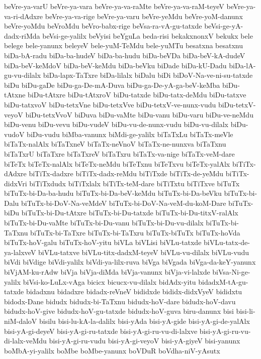 {beVre-ya-varU
beVre-ya-vara
beVre-ya-va-raMte
beVre-ya-va-raM-teyeV
beVre-ya-va-ri-dAdxre
beVre-ya-va-rige
beVre-ya-varu
beVre-yeMdu
beVre-yoM-danunx
beVre-yoMdu
beVroMdu
beVro-babx-rige
beVsa-ra-vA-gu-tatxde
beVsi-ge-yA-dadx-riMda
beVsi-ge-yalilx
beVyisi
beYguLa
beda-risi
bekakxnonxV
bekukx
bele
belege
bele-yanunx
beleyeV
bele-yuM-TeMdu
bele-yuMTu
besatxna
besatxnu
biDa-bA-radu
biDa-ba-hudeV
biDa-ba-hudu
biDa-beVDa
biDa-beV-kA-dudeV
biDa-beV-keMdoV
biDa-beV-keMdu
biDa-beVku
biDade
biDa-kU-Dadu
biDa-lA-gu-vu-dilalx
biDa-lapx-TaTxre
biDa-lilalx
biDalu
biDi
biDoV-Na-ve-ni-su-tatxde
biDu
biDu-gaDe
biDu-ga-De-mA-Duva
biDu-ga-De-yA-ga-beV-keMba
biDu-tAtxne
biDu-tAtxre
biDu-tAtxroV
biDu-tatxde
biDu-tatx-deMdu
biDu-tatxve
biDu-tatxvoV
biDu-tetxVne
biDu-tetxVve
biDu-tetxV-ve-nunx-vudu
biDu-tetxV-veyoV
biDu-tetxVvoV
biDuva
biDu-vaMte
biDu-vanu
biDu-varu
biDu-ve-neMdu
biDu-venu
biDu-vevu
biDu-vudeV
biDu-vu-de-nunx-vudu
biDu-vu-dilalx
biDu-vudoV
biDu-vudu
biMba-vanunx
biMdi-ge-yalilx
biTaTxLu
biTaTx-meVle
biTaTx-nalAlx
biTaTxneV
biTaTx-neVnoV
biTaTx-ne-nunxva
biTaTxnu
biTaTxrU
biTaTxre
biTaTxreV
biTaTxru
biTaTx-va-nige
biTaTx-veM-dare
biTeTx
biTeTx-nalAlx
biTeTx-neMdu
biTeTxnu
biTeTxvu
biTeTx-yalAlx
biTiTx-dAdxre
biTiTx-dadxre
biTiTx-dadx-reMdu
biTiTxde
biTiTx-de-yeMdu
biTiTx-didxVri
biTiTxdudx
biTiTxlalx
biTiTx-teM-dare
biTiTxtu
biTiTxve
biTuTx
biTuTx-bi-Da-ba-hudu
biTuTx-bi-Da-beV-keMdu
biTuTx-bi-Da-beVku
biTuTx-bi-Dalu
biTuTx-bi-DoV-Na-veMdeV
biTuTx-bi-DoV-Na-veM-du-koM-Dare
biTuTx-biDu
biTuTx-bi-Du-tAtxre
biTuTx-bi-Du-tatxde
biTuTx-bi-Du-titxV-ralAlx
biTuTx-bi-Du-vaMte
biTuTx-bi-Du-vanu
biTuTx-bi-Du-vu-dilalx
biTuTx-bi-TaTxnu
biTuTx-bi-TaTxre
biTuTx-bi-TaTxru
biTuTx-biTuTx
biTuTx-hoVda
biTuTx-hoV-galu
biTuTx-hoV-yitu
biVLa
biVLisi
biVLu-tatxde
biVLu-tatx-de-ya-lalxveV
biVLu-tatxve
biVLu-titx-dadxM-teyeV
biVLu-vu-dilalx
biVLu-vudu
biVdi
biVdige
biVdi-yalilx
biVdi-ya-lilx-ruva
biVga
biVgada
biVga-da-keY-yanunx
biVjAM-ku-rAdw
biVja
biVja-diMda
biVja-vanunx
biVja-vi-lalxde
biVsa-Ni-ge-yalilx
biVsi-ko-LuLx-vAga
bicicx
bicucx-vu-dilalx
bidAdx-yitu
bidadxM-tA-gu-tatxde
bidadxnu
bidadxre
bidadx-reVneV
bididxde
bididx-didxVyeV
bididxtu
bidodx-Dane
bidudx
bidudx-bi-TaTxnu
bidudx-hoV-dare
bidudx-hoV-davu
bidudx-hoV-give
bidudx-hoV-gu-tatxde
bidudx-hoV-guva
biru-danunx
bisi
bisi-li-niM-daloV
bisilu
bisi-lu-kA-la-dalilx
bisi-yAda
bisi-yA-gide
bisi-yA-gi-de-yalAlx
bisi-yA-gi-deyeV
bisi-yA-gi-ru-tatxde
bisi-yA-gi-ru-vu-di-lalxve
bisi-yA-gi-ru-vu-di-lalx-veMdu
bisi-yA-gi-ru-vudu
bisi-yA-gi-veyoV
bisi-yA-giyeV
bisi-yanunx
boMbA-yi-yalilx
boMbe
boMbe-yanunx
boVDuR
boVdha-niV-yAsutx
}

